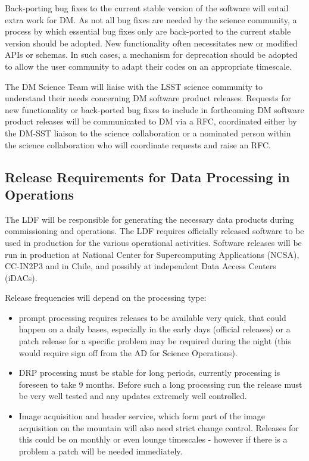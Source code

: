 Back-porting bug fixes to the current stable version of the software will entail extra work for \gls{DM}. 
As not all bug fixes are needed by the science community, a process by which essential bug fixes only are back-ported to the current stable version should be adopted. 
New functionality often necessitates new or modified APIs or schemas. 
In such cases, a mechanism for deprecation should be adopted to allow the user community to adapt their codes on an appropriate timescale.  

The \gls{DM} Science Team will liaise with the \gls{LSST} science community to understand their needs concerning \gls{DM} software product releases. 
Requests for new functionality or back-ported bug fixes to include in forthcoming \gls{DM} software product releases will be communicated to \gls{DM} via a \gls{RFC}, coordinated either by the DM-SST liaison to the science collaboration or a nominated person within the science collaboration who will coordinate requests and raise an \gls{RFC}. 


\subsection{Release Requirements for Data Processing in Operations} \label{sec:procreqs}


The \gls{LDF} will be responsible for generating the necessary data products during commissioning and operations. 
The \gls{LDF} requires officially released software to be used in production for the various operational activities.
Software releases will be run in production at National \gls{Center} for Supercomputing Applications (\gls{NCSA}), CC-IN2P3 and in Chile, and possibly at independent Data Access Centers (iDACs).

Release frequencies will depend on the processing type:
\begin{itemize}
\item prompt processing requires releases to be available very quick, that could happen on a daily bases, especially in the early days (official releases)
 or a  \gls{patch} release  for a specific problem may be required during the night (this would require sign off from the \gls{AD} for Science \gls{Operations}).
\item \gls{DRP} processing  must be stable for long periods, currently processing is foreseen to take 9 months.  Before such a long processing run the release must be very well tested and any updates extremely well controlled.
\item Image acquisition and header service, which form part of the image acquisition on the mountain will also need strict change control. Releases for this could be on monthly or even lounge timescales - however if there is a problem a \gls{patch} will be needed immediately.
\end{itemize}

